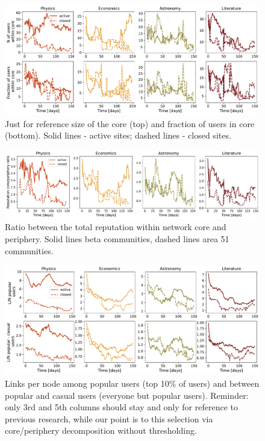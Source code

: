 
\begin{figure}[h!]
	\centering
	\includegraphics[width=\linewidth]{figures/stackexchange/core_users.pdf}
	\caption{Just for reference size of the core (top) and fraction of users in core (bottom). Solid lines - active sites; dashed lines - closed sites.}
	\label{fig:core_size}
\end{figure}

\begin{figure}[h!]
	\centering
	\includegraphics[width=\linewidth]{figures/stackexchange/core_per_ratio_reputation.pdf}
	\caption{Ratio between the total reputation within network core and periphery. Solid lines beta communities, dashed lines area 51 communities.}
	\label{fig:dr_core_per}
\end{figure}

\clearpage
\begin{figure}[h!]
	\centering
	\includegraphics[width=\linewidth]{figures/stackexchange/popular_casual_users.pdf}
	\caption{Links per node among popular users (top 10\% of users) and between popular and casual users (everyone but popular users).
		Reminder: only 3rd and 5th columns should stay and only for reference to previous research, while our point is to this selection via core/periphery decomposition without thresholding.}
	\label{fig:pop_cas_users}
\end{figure}

